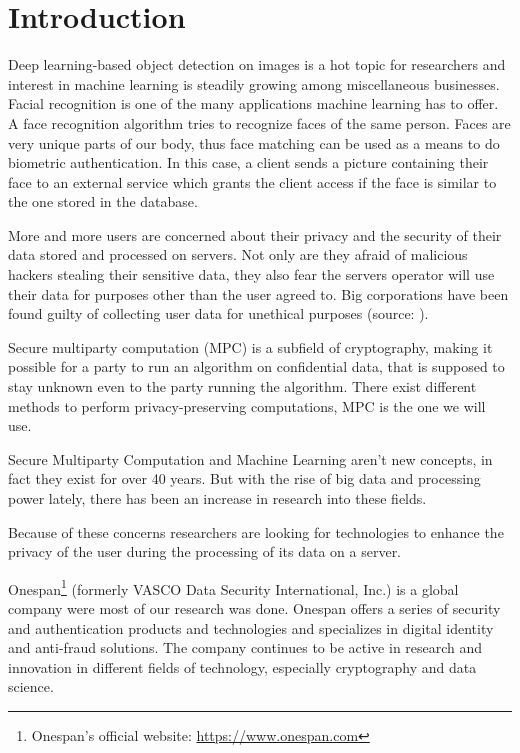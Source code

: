 
\chapter{Introduction}
Deep learning-based object detection on images is a hot topic for researchers and interest in machine learning is steadily growing among miscellaneous businesses. Facial recognition is one of the many applications machine learning has to offer. A face recognition algorithm tries to recognize faces of the same person. Faces are very unique parts of our body, thus face matching can be used as a means to do biometric authentication. In this case, a client sends a picture containing their face to an external service which grants the client access if the face is similar to the one stored in the database.

More and more users are concerned about their privacy and the security of their data stored and processed on servers. Not only are they afraid of malicious hackers stealing their sensitive data, they also fear the servers operator will use their data for purposes other than the user agreed to. Big corporations have been found guilty of collecting user data for unethical purposes (source: \cite{cadwalladr2018revealed}).

Secure multiparty computation (MPC) is a subfield of cryptography, making it possible for a party to run an algorithm on confidential data, that is supposed to stay unknown even to the party running the algorithm. There exist different methods to perform privacy-preserving computations, MPC is the one we will use.

Secure Multiparty Computation and Machine Learning aren't new concepts, in fact they exist for over 40 years. But with the rise of big data and processing power lately, there has been an increase in research into these fields.

Because of these concerns researchers are looking for technologies to enhance the privacy of the user during the processing of its data on a server.

Onespan\footnote{Onespan's official website: \url{https://www.onespan.com}} (formerly VASCO Data Security International, Inc.) is a global company were most of our research was done. Onespan offers a series of security and authentication products and technologies and specializes in digital identity and anti-fraud solutions. The company continues to be active in research and innovation in different fields of technology, especially cryptography and data science.

